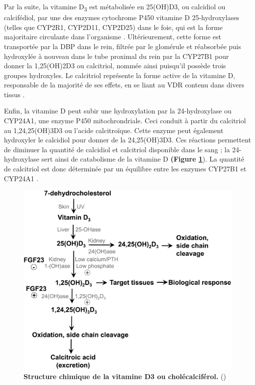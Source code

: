 \documentclass[
  a4paper,
  DIV=11,
  numbers=noendperiod,
  listof=totoc]{scrreprt}
\begin{document}
Par la suite, la vitamine D\textsubscript{3} est métabolisée en
\ac{25(OH)D3}, ou calcidiol ou calcifédiol, par une des enzymes
cytochrome P450 vitamine D 25-hydroxylases (telles que CYP2R1, CYP2D11,
CYP2D25) dans le foie, qui est la forme majoritaire circulante dans
l'organisme \autocite{Norman.2008,Christakos.2010}. Ultérieurement,
cette forme est transportée par la \ac{DBP} dans le rein, filtrée par le
glomérule et réabsorbée puis hydroxylée à nouveau dans le tube proximal
du rein par la \ac{CYP27B1} pour donner la \ac{1,25(OH)2D3} ou
calcitriol, nommée ainsi puisqu'il possède trois groupes hydroxyles. Le
calcitriol représente la forme active de la vitamine D, responsable de
la majorité de ses effets, en se liant au \ac{VDR} contenu dans divers
tissus \autocite{Norman.2008,Dankers.2017}.

Enfin, la vitamine D peut subir une hydroxylation par la 24-hydroxylase
ou \acs{CYP24A1}, une enzyme P450 mitochrondriale. Ceci conduit à partir
du calcitriol au \acs{1,24,25(OH)3D3} ou l'acide calcitroïque. Cette
enzyme peut également hydroxyler le calcidiol pour donner de la
\ac{24,25(OH)3D3}. Ces réactions permettent de diminuer la quantité de
calcidiol et calcitriol disponible dans le sang ; la 24-hydroxylase sert
ainsi de catabolisme de la vitamine D \autocite{Norman.2008}
\textbf{(Figure \ref{fig:metabolism-vitd}}). La quantité de calcitriol
est donc déterminée par un équilibre entre les enzymes \ac{CYP27B1} et
\ac{CYP24A1} \autocite{Dankers.2017}.

\begin{figure}
\centering
\includegraphics{figures/vitamin-d-metabolism.png} 
\caption[\textbf{Métabolisme de la vitamine D.}]{\textbf{Structure chimique de la vitamine D3 ou cholécalciférol.} (\cite{Norman.2008})}
\label{fig:metabolism-vitd}
\end{figure}
\end{document}
